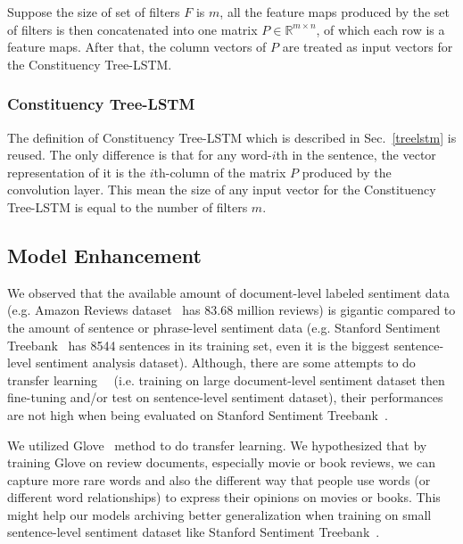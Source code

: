Suppose the size of set of filters \(F\) is \(m\), all the feature maps produced by the set of filters is then concatenated into one matrix \(P \in \mathbb{R}^{m \times n}\), of which each row is a feature maps.
After that, the column vectors of \(P\) are treated as input vectors for the Constituency Tree-LSTM.
\subsubsection{Constituency Tree-LSTM}
The definition of Constituency Tree-LSTM which is described in Sec.~\ref{treelstm} is reused.
The only difference is that for any word-\(i\)th in the sentence, the vector representation of it is the \(i\)th-column of the matrix \(P\) produced by the convolution layer.
This mean the size of any input vector for the Constituency Tree-LSTM is equal to the number of filters \(m\).
\subsection{Model Enhancement}
We observed that the available amount of document-level labeled sentiment data (e.g. Amazon Reviews dataset~\cite{amazon-reviews} has 83.68 million reviews) is gigantic compared to the amount of sentence or phrase-level sentiment data (e.g. Stanford Sentiment Treebank~\cite{socher2013recursive} has 8544 sentences in its training set, even it is the biggest sentence-level sentiment analysis dataset).
Although, there are some attempts to do transfer learning~\cite{group-instance}~\cite{re-embedding} (i.e. training on large document-level sentiment dataset then fine-tuning and/or test on sentence-level sentiment dataset), their performances are not high when being evaluated on Stanford Sentiment Treebank~\cite{group-instance}.

We utilized Glove~\cite{glove} method to do transfer learning.
We hypothesized that by training Glove on review documents, especially movie or book reviews, we can capture more rare words and also the different way that people use words (or different word relationships) to express their opinions on movies or books.
This might help our models archiving better generalization when training on small sentence-level sentiment dataset like Stanford Sentiment Treebank~\cite{socher2013recursive}.